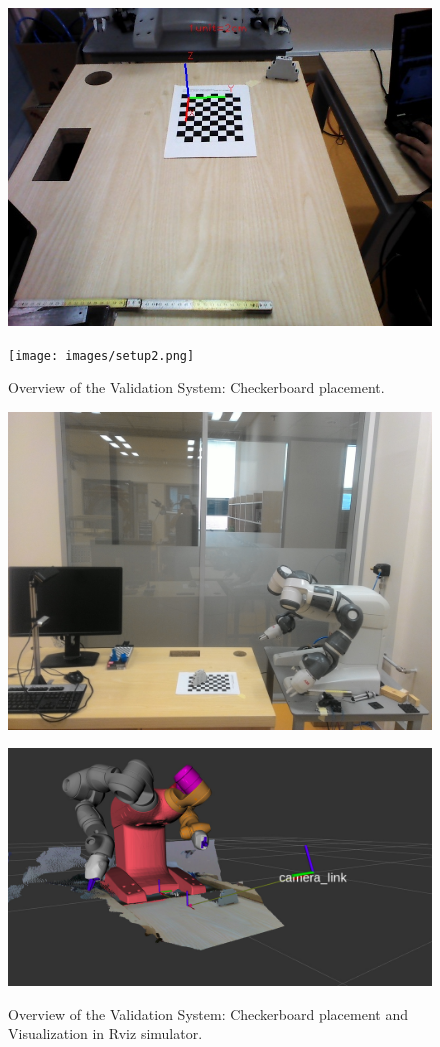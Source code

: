 \begin{figure}[htp]
\begin{center}
{
  \includegraphics[clip,width=0.7\columnwidth]{images/setup3.jpg}
}
\end{center}
\begin{center}
{
  \texttt{[image: images/setup2.png]}
}
\end{center}

\caption{Overview of the Validation System: Checkerboard placement.}
\label{setupsystem1}
\end{figure}



\begin{figure}[htp]
\begin{center}
{
  \includegraphics[clip,width=0.7\columnwidth]{images/setup1.jpg}
}
\end{center}
\begin{center}
{
  \includegraphics[clip,width=0.7\columnwidth]{images/system1.jpg}
}
\end{center}
\caption{Overview of the Validation System: Checkerboard placement and Visualization in Rviz simulator.}
\label{setupsystem2}
\end{figure}


